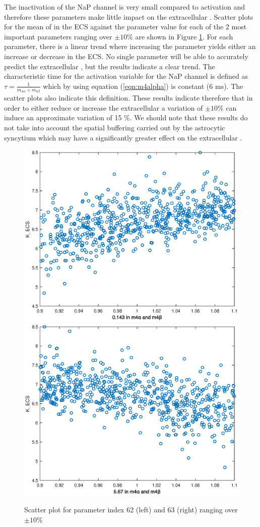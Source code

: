 The inactivation of the NaP channel is very small compared to activation and therefore these parameters make little impact on the extracellular \pot. 
Scatter plots for the mean of \pot in the  ECS against the parameter value for each of the 2 most important parameters ranging over $\pm 10\%$  are shown in Figure \ref{fig:scatter}.  For each parameter, there is a linear trend where increasing the parameter yields either an increase or decrease in the \pot ECS. No single parameter will be able to accurately predict the extracellular \pot, but the results indicate a clear trend. The characteristic time for the activation variable for the NaP channel is defined as $\tau=\frac{1}{m_{4 \alpha}+m_{4 \beta}}$ which by using equation (\ref{eqn:m4alpha}) is constant (6 ms). The scatter plots also indicate this definition. These results indicate therefore that in order to either reduce or increase the extracellular \pot a variation of $\pm 10 \%$ can induce an approximate variation of 15 $\%$. We should note that these results do not take into account the spatial buffering carried out by the astrocytic syncytium which may have a significantly greater effect on the extracellular \pot. 
\begin{figure}
\centering
\includegraphics[width=0.49\linewidth]{Figures/Scatter_62_K_ECS}
\includegraphics[width=0.49\linewidth]{Figures/Scatter_63_K_ECS}
\caption{Scatter plot for parameter index 62 (left) and 63 (right) ranging over  $\pm 10\%$ }
\label{fig:scatter}
\end{figure}
